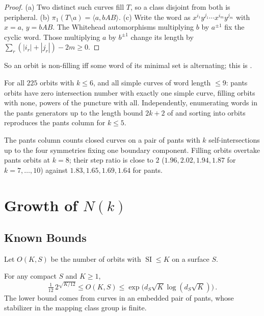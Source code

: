 \documentclass[10pt]{article}
\begin{document}
\begin{proof}
	(a) Two distinct such curves fill $T$, so a class disjoint from both is peripheral.
	(b) $\pi_1(T \setminus a) = \langle a, bAB \rangle$.
	(c) Write the word as $x^{i_1} y^{j_1} \cdots x^{i_m} y^{j_m}$ with $x = a$, $y = bAB$.
	The Whitehead automorphisms multiplying $b$ by $a^{\pm 1}$ fix the cyclic word.
	Those multiplying $a$ by $b^{\pm 1}$ change its length by $\sum_r (|i_r| + |j_r|) - 2m \geq 0$.
\end{proof}

So an orbit is non-filling iff some word of its minimal set is alternating; this is .

\begin{rmk}[checks]
	For all $225$ orbits with $k \leq 6$, and all simple curves of word length $\leq 9$: pants orbits have zero intersection number with exactly one simple curve, filling orbits with none, powers of the puncture with all.
	Independently, enumerating words in the pants generators up to the length bound $2k+2$ of \citet{chasphillips12} and sorting into orbits reproduces the pants column for $k \leq 5$.
\end{rmk}

\begin{rmk}
	The pants column counts closed curves on a pair of pants with $k$ self-intersections up to the four symmetries fixing one boundary component.
	Filling orbits overtake pants orbits at $k = 8$; their step ratio is close to $2$ ($1.96, 2.02, 1.94, 1.87$ for $k = 7,\ldots,10$) against $1.83, 1.65, 1.69, 1.64$ for pants.
\end{rmk}

\section{Growth of $N(k)$}

\subsection{Known Bounds}

Let $O(K,S)$ be the number of orbits with $\operatorname{SI} \leq K$ on a surface $S$.

\begin{thm}
	For any compact $S$ and $K \geq 1$,
	\[
		\tfrac{1}{12}\, 2^{\sqrt{K/12}} \leq O(K,S) \leq \exp\bigl(d_S \sqrt{K} \log(d_S \sqrt{K})\bigr) \, .
	\]
	The lower bound comes from curves in an embedded pair of pants, whose stabilizer in the mapping class group is finite.
\end{thm}
\end{document}
